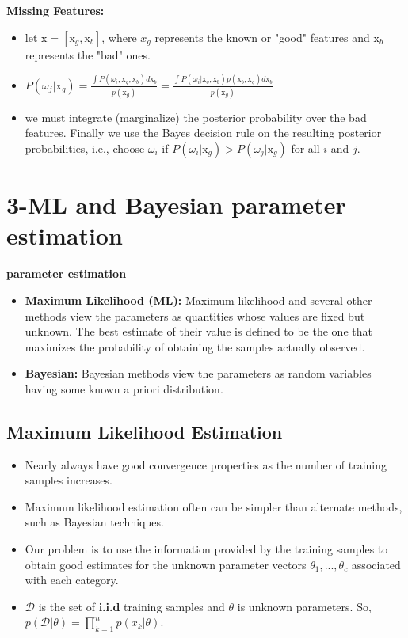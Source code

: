 \documentclass{../cheat}
\begin{document}
\begin{multicols}{3}
	\textbf{Missing Features:}
	\begin{itemize}[nolistsep, leftmargin=1em]
		\item let $\mathrm{x} = [\mathrm{x}_g, \mathrm{x}_b]$, where $x_g$ represents the known or "good" features and $\mathrm{x}_b$ represents the "bad" ones.
		\item $P(\omega_j|\mathrm{x}_g)=\frac{\int P(\omega_i,\mathrm{x}_g,\mathrm{x}_b) d\mathrm{x}_b}{p(\mathrm{x}_g)}=\frac{\int P(\omega_i|\mathrm{x}_g,\mathrm{x}_b) p(\mathrm{x}_b,\mathrm{x}_g) d\mathrm{x}_b}{p(\mathrm{x}_g)}$
		\item we must integrate (marginalize) the posterior probability over the bad features. Finally we
use the Bayes decision rule on the resulting posterior probabilities, i.e., choose $\omega_i$ if $P(\omega_i|\mathrm{x}_g) > P(\omega_j |\mathrm{x}_g)$ for all $i$ and $j$.
	\end{itemize}
	

	\section{3-ML and Bayesian parameter estimation}
		\textbf{parameter estimation}
		\begin{itemize}[nolistsep, leftmargin=1em]
			\item \textbf{Maximum Likelihood (ML):} Maximum likelihood and several other methods view
the parameters as quantities whose values are fixed but unknown. The best estimate
of their value is defined to be the one that maximizes the probability of obtaining
the samples actually observed.
			\item \textbf{Bayesian:} Bayesian methods view the parameters as
random variables having some known a priori distribution.
		\end{itemize}
	
		\subsection{Maximum Likelihood Estimation}
		\begin{itemize}[nolistsep, leftmargin=1em]
			\item Nearly always have good convergence properties as the number of training samples increases. 
			\item	Maximum likelihood estimation often can be simpler than alternate methods, such as Bayesian techniques.
			\item Our problem is to use the information provided by the training samples to obtain good estimates for the unknown parameter vectors $\theta_1, ... , \theta_c$ associated with each category.
			\item $\mathcal{D}$ is the set of \textbf{i.i.d} training samples and $\theta$ is unknown parameters. So,  $p(\mathcal{D}|\theta)=\prod_{k=1}^{n} p(x_k|\theta)$.
		\end{itemize}
	

\end{multicols}
\end{document}
